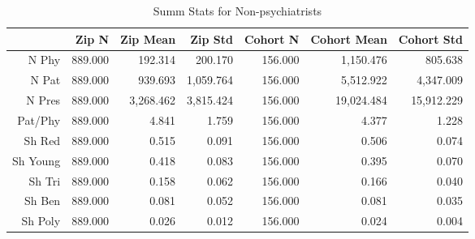 \begin{table}[h]
\centering
\caption{Summ Stats for Non-psychiatrists} 
\begin{tabular}{rrrrrrr}
  \hline
 & Zip N & Zip Mean & Zip Std & Cohort N & Cohort Mean & Cohort Std \\ 
  \hline
N Phy & 889.000 & 192.314 & 200.170 & 156.000 & 1,150.476 & 805.638 \\ 
   \hline
N Pat & 889.000 & 939.693 & 1,059.764 & 156.000 & 5,512.922 & 4,347.009 \\ 
   \hline
N Pres & 889.000 & 3,268.462 & 3,815.424 & 156.000 & 19,024.484 & 15,912.229 \\ 
   \hline
Pat/Phy & 889.000 & 4.841 & 1.759 & 156.000 & 4.377 & 1.228 \\ 
   \hline
Sh Red & 889.000 & 0.515 & 0.091 & 156.000 & 0.506 & 0.074 \\ 
   \hline
Sh Young & 889.000 & 0.418 & 0.083 & 156.000 & 0.395 & 0.070 \\ 
   \hline
Sh Tri & 889.000 & 0.158 & 0.062 & 156.000 & 0.166 & 0.040 \\ 
   \hline
Sh Ben & 889.000 & 0.081 & 0.052 & 156.000 & 0.081 & 0.035 \\ 
   \hline
Sh Poly & 889.000 & 0.026 & 0.012 & 156.000 & 0.024 & 0.004 \\ 
   \hline
\end{tabular}
\end{table}
